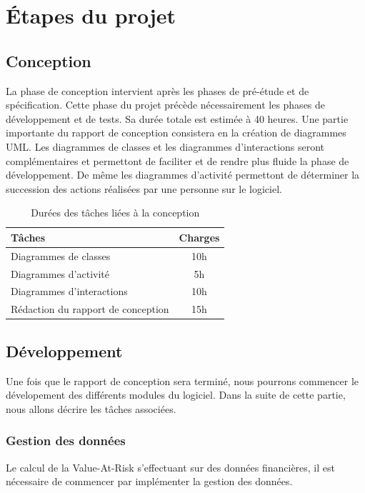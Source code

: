 \documentclass[a4paper]{report}
\begin{document}
\chapter{Étapes du projet}


\section{Conception}
La phase de conception intervient après les phases de pré-étude et de spécification. Cette phase du projet précède nécessairement les phases de développement et de tests. Sa durée totale est estimée à 40 heures. Une partie importante du rapport de conception consistera en la création de diagrammes UML. Les diagrammes de classes et les diagrammes d'interactions seront complémentaires et permettont de faciliter et de rendre plus fluide la phase de développement. De même les diagrammes d'activité permettont de déterminer la succession des actions réalisées par une personne sur le logiciel.

\begin{table}[H]
\centering
  \begin{tabularx}{0.8\textwidth}{| X | c |}
    \hline
	Tâches & Charges \\
    \hline
     Diagrammes de classes & 10h \\
     Diagrammes d'activité & 5h \\
     Diagrammes d'interactions & 10h \\
     Rédaction du rapport de conception &  15h\\
    \hline
  \end{tabularx}
  \caption{Durées des tâches liées à la conception}
\end{table}


\section{Développement}
Une fois que le rapport de conception sera terminé, nous pourrons commencer le dévelopement des différents modules du logiciel. Dans la suite de cette partie, nous allons décrire les tâches associées.

\subsection{Gestion des données}
Le calcul de la Value-At-Risk s'effectuant sur des données financières, il est nécessaire de commencer par implémenter la gestion des données.
\end{document}
